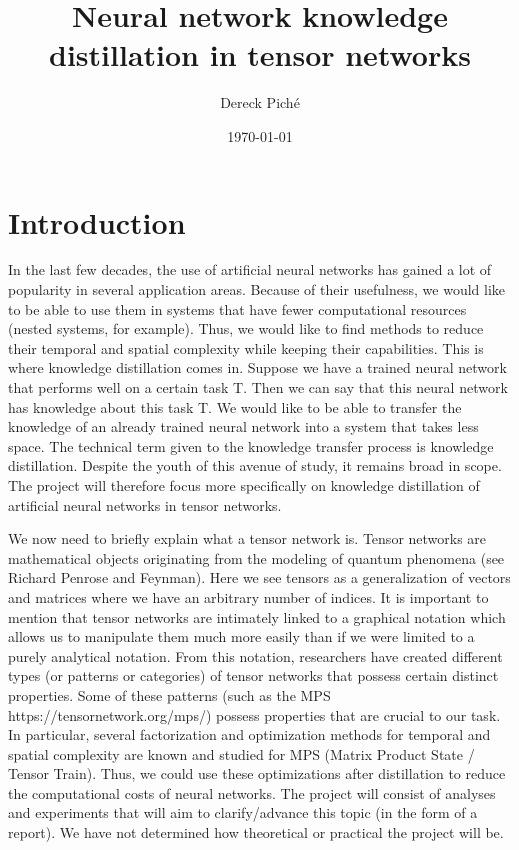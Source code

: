 \documentclass[11pt]{article}
\title{Neural network knowledge distillation in tensor networks}
\author{Dereck Piché}
\date{\today}
\begin{document}
\maketitle
\begin{abstract}
\end{abstract}

\section{Introduction}
In the last few decades, the use of artificial neural networks 
has gained a lot of popularity in several application areas. Because 
of their usefulness, we would like to be able to use them in systems 
that have fewer computational resources (nested systems, for example). 
Thus, we would like to find methods to reduce their temporal and 
spatial complexity while keeping their capabilities. This is where 
knowledge distillation comes in. Suppose we have a trained neural 
network that performs well on a certain task T. Then we can say 
that this neural network has knowledge about this task T. We would 
like to be able to transfer the knowledge of an already trained neural 
network into a system that takes less space. The technical term given 
to the knowledge transfer process is knowledge distillation. Despite 
the youth of this avenue of study, it remains broad in scope. The 
project will therefore focus more specifically on knowledge distillation 
of artificial neural networks in tensor networks. 

We now need to briefly explain what a tensor network is. 
Tensor networks are mathematical objects originating from the modeling 
of quantum phenomena (see Richard Penrose and Feynman). Here we see tensors 
as a generalization of vectors and matrices where we have an arbitrary 
number of indices. It is important to mention that tensor networks are 
intimately linked to a graphical notation which allows us to manipulate 
them much more easily than if we were limited to a purely analytical notation.
 From this notation, researchers have created different types (or patterns or categories) 
 of tensor networks that possess certain distinct properties. Some of these patterns 
 (such as the MPS https://tensornetwork.org/mps/) possess properties that are crucial
  to our task. In particular, several factorization and optimization methods for 
  temporal and spatial complexity are known and studied for MPS (Matrix Product 
  State / Tensor Train). Thus, we could use these optimizations after distillation 
  to reduce the computational costs of neural networks. The project will consist 
  of analyses and experiments that will aim to clarify/advance this topic (in the 
  form of a report). We have not determined how theoretical or practical the project will be.
\end{document}
